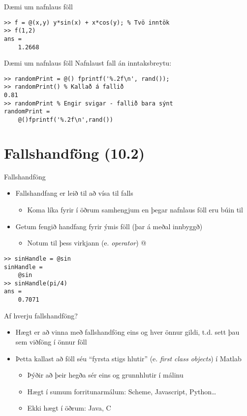 \documentclass[handout]{beamer}
\begin{document}
\begin{frame}[fragile]{Dæmi um nafnlaus föll}
\begin{verbatim}
>> f = @(x,y) y*sin(x) + x*cos(y); % Tvö inntök
>> f(1,2)
ans =
    1.2668
\end{verbatim}
\end{frame}

\begin{frame}[fragile]{Dæmi um nafnlaus föll}
Nafnlaust fall án inntaksbreytu:
\begin{verbatim}
>> randomPrint = @() fprintf('%.2f\n', rand());
>> randomPrint() % Kallað á fallið
0.81
>> randomPrint % Engir svigar - fallið bara sýnt
randomPrint = 
    @()fprintf('%.2f\n',rand())
\end{verbatim}
\end{frame}

\section{Fallshandföng (10.2)}

\begin{frame}[fragile]{Fallshandföng}
\vspace{\baselineskip}
\begin{itemize}
 \item Fallshandfang er leið til að vísa til falls
 \begin{itemize}
  \item Koma líka fyrir í öðrum samhengjum en þegar nafnlaus föll eru búin til
 \end{itemize}
 \item Getum fengið handfang fyrir ýmis föll (þar á meðal innbyggð)
 \begin{itemize}
  \item Notum til þess virkjann (e. \emph{operator}) @
 \end{itemize}
\end{itemize}
\begin{verbatim}
>> sinHandle = @sin
sinHandle = 
    @sin
>> sinHandle(pi/4)
ans =
    0.7071
\end{verbatim}
\end{frame}

\begin{frame}{Af hverju fallshandföng?}
\begin{itemize}
 \item Hægt er að vinna með fallshandföng eins og hver önnur gildi, t.d. sett þau sem viðföng í önnur föll
 \item Þetta kallast að föll séu ``fyrsta stigs hlutir'' (e. \emph{first class objects}) í Matlab
 \begin{itemize}
  \item Þýðir að þeir hegða sér eins og grunnhlutir í málinu
  \item Hægt í sumum forritunarmálum: Scheme, Javascript, Python\ldots
  \item Ekki hægt í öðrum: Java, C
 \end{itemize}
\end{itemize}
\end{frame}
\end{document}
